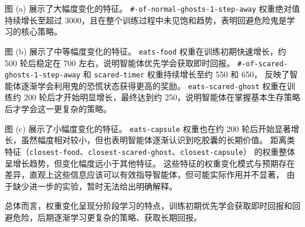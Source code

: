图 (a) 展示了大幅度变化的特征。
\texttt{\#-of-normal-ghosts-1-step-away} 权重绝对值持续增长至超过 3000，且在整个训练过程中未见饱和趋势，表明回避危险鬼是学习的核心策略。

图 (b) 展示了中等幅度变化的特征。
\texttt{eats-food} 权重在训练初期快速增长，约 500 轮后稳定在 700 左右，说明智能体优先学会获取即时回报。
\texttt{\#-of-scared-ghosts-1-step-away} 和 \texttt{scared-timer} 权重持续增长至约 550 和 650，
反映了智能体逐渐学会利用鬼的恐慌状态获得更高的奖励。
\texttt{eats-scared-ghost} 权重在训练约 200 轮后才开始明显增长，最终达到约 250，说明智能体在掌握基本生存策略后才学会这一更复杂的策略。

图 (c) 展示了小幅度变化的特征。
\texttt{eats-capsule} 权重也在约 200 轮后开始显著增长，虽然幅度相对较小，但也表明智能体逐渐认识到吃胶囊的长期价值。
距离类特征（\texttt{closest-food}、\texttt{closest-scared-ghost}、\texttt{closest-capsule}）
的权重整体呈增长趋势，但变化幅度远小于其他特征。
这些特征的权重变化模式与预期存在差异，直观上这些信息应该可以有效指导智能体，但可能实际作用并不显著，
由于缺少进一步的实验，暂时无法给出明确解释。

总体而言，权重变化呈现分阶段学习的特点，训练初期优先学会获取即时回报和回避危险，后期逐渐学习更复杂的策略、获取长期回报。








